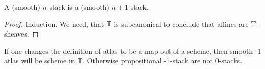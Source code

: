 \documentclass{article}
\newcommand{\red}[1]{{\color{red} #1}}
\begin{document}
\begin{lemma}{\label{lemma:succStab}}
    A  (smooth) $n$-stack is a  (smooth) $n+1$-stack.
\end{lemma}

\begin{proof}
    Induction. 
    We need, that $\mathbb{T}$ is subcanonical to conclude that affines are $\mathbb{T}$-sheaves.
\end{proof}
\begin{rmk}
    If one changes the definition of atlas to be a map out of a scheme, then smooth -1 atlas will be scheme in $\mathbb{T}$. Otherwise propositional -1-stack are not 0-stacks.
\end{rmk}
\end{document}
